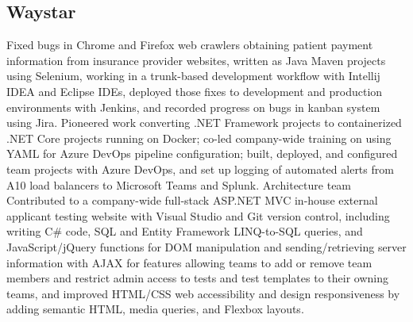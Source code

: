 \subsection{Waystar}
{
	Fixed bugs in Chrome and Firefox web crawlers obtaining patient payment information from insurance provider websites, written as Java Maven projects using Selenium, working in a trunk-based development workflow with Intellij IDEA and Eclipse IDEs, deployed those fixes to development and production environments with Jenkins, and recorded progress on bugs in kanban system using Jira.
}
{
	Pioneered work converting .NET Framework projects to containerized .NET Core projects running on Docker; co-led company-wide training on using YAML for Azure DevOps pipeline configuration; built, deployed, and configured team projects with Azure DevOps, and set up logging of automated alerts from A10 load balancers to Microsoft Teams and Splunk.
}
{Architecture team}
{}
{
	Contributed to a company-wide full-stack ASP.NET MVC in-house external applicant testing website with Visual Studio and Git version control, 
	including writing C\# code, 
	SQL and Entity Framework LINQ-to-SQL queries, 
	and JavaScript/jQuery functions for DOM manipulation and sending/retrieving server information with AJAX for features allowing teams to add or remove team members and restrict admin access to tests and test templates to their owning teams, 
	and improved HTML/CSS web accessibility and design responsiveness by adding semantic HTML, 
	media queries, 
	and Flexbox layouts.
}
